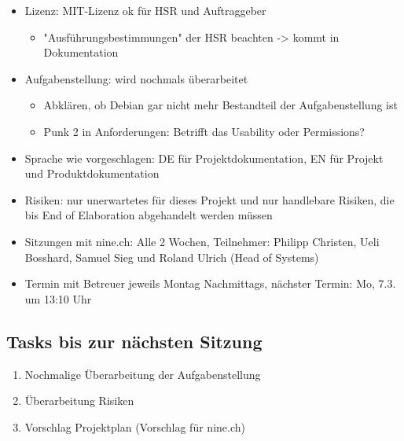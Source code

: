 \documentclass[class=scrbook,crop=false]{standalone}
\begin{document}
	\begin{itemize}
		\item Lizenz: MIT-Lizenz ok für HSR und Auftraggeber
		\begin{itemize}
		    \item "Ausführungsbestimmungen" der HSR beachten -> kommt in Dokumentation
	    \end{itemize}
		\item Aufgabenstellung: wird nochmals überarbeitet
		\begin{itemize}
		    \item Abklären, ob Debian gar nicht mehr Bestandteil der Aufgabenstellung ist
		    \item Punk 2 in Anforderungen: Betrifft das Usability oder Permissions?
	    \end{itemize}
		\item Sprache wie vorgeschlagen: DE für Projektdokumentation, EN für Projekt und Produktdokumentation
		\item Risiken: nur unerwartetes für dieses Projekt und nur handlebare Risiken, die bis End of Elaboration abgehandelt werden müssen
		\item Sitzungen mit nine.ch: Alle 2 Wochen, Teilnehmer: Philipp Christen, Ueli Bosshard, Samuel Sieg und Roland Ulrich (Head of Systems)
		\item Termin mit Betreuer jeweils Montag Nachmittags, nächster Termin: Mo, 7.3. um 13:10 Uhr
	\end{itemize}
	
    \subsection*{Tasks bis zur nächsten Sitzung}
    
    \begin{enumerate}
        \item Nochmalige Überarbeitung der Aufgabenstellung
        \item Überarbeitung Risiken
        \item Vorschlag Projektplan (Vorschlag für nine.ch)
    \end{enumerate}
\end{document}
